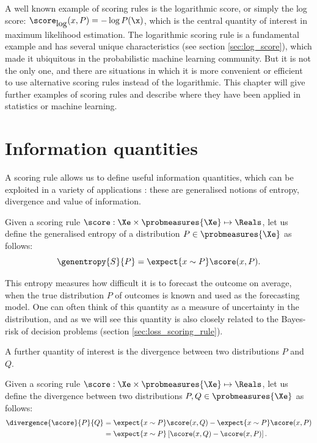 A well known example of scoring rules is the logarithmic score, or simply the log score: $\score_{\mbox{log}}(x,P) = -\log P(\x)$, which is the central quantity of interest in maximum likelihood estimation. The logarithmic scoring rule is a fundamental example and has several unique characteristics (see section \ref{sec:log_score}), which made it ubiquitous in the probabilistic machine learning community. But it is not the only one, and there are situations in which it is more convenient or efficient to use alternative scoring rules instead of the logarithmic. This chapter will give further examples of scoring rules and describe where they have been applied in statistics or machine learning.

\section{Information quantities}

A scoring rule allows us to define useful information quantities, which can be exploited in a variety of applications \citep[see also][]{Gneiting2007}: these are generalised notions of entropy, divergence and value of information.
\begin{definition}
Given a scoring rule $\score:\Xe\times\probmeasures{\Xe}\mapsto\Reals$, let us define the generalised entropy of a distribution $P\in\probmeasures{\Xe}$ as follows:
%
\begin{equation}
	\genentropy{S}{P}= \expect{x\sim P} \score(x,P).
\end{equation}
\end{definition}


This entropy measures how difficult it is to forecast the outcome on average, when the true distribution $P$ of outcomes is known and used as the forecasting model. One can often think of this quantity as a measure of uncertainty in the distribution, and as we will see this quantity is also closely related to the Bayes-risk of decision problems (section \ref{sec:loss_scoring_rule}).

A further quantity of interest is the divergence between two distributions $P$ and $Q$.

\begin{definition}\label{def:generalised_divergence}
Given a scoring rule $\score:\Xe\times\probmeasures{\Xe}\mapsto\Reals$, let us define the divergence between two distributions $P,Q\in\probmeasures{\Xe}$ as follows:
%
	\begin{align}
		\divergence{\score}{P}{Q} &= \expect{x\sim P} \score(x,Q) - \expect{x\sim P} \score(x,P)\\\label{eqn:def_divergence}
		&=\expect{x\sim P} \left[ \score(x,Q) - \score(x,P) \right].
	\end{align}
\end{definition}

